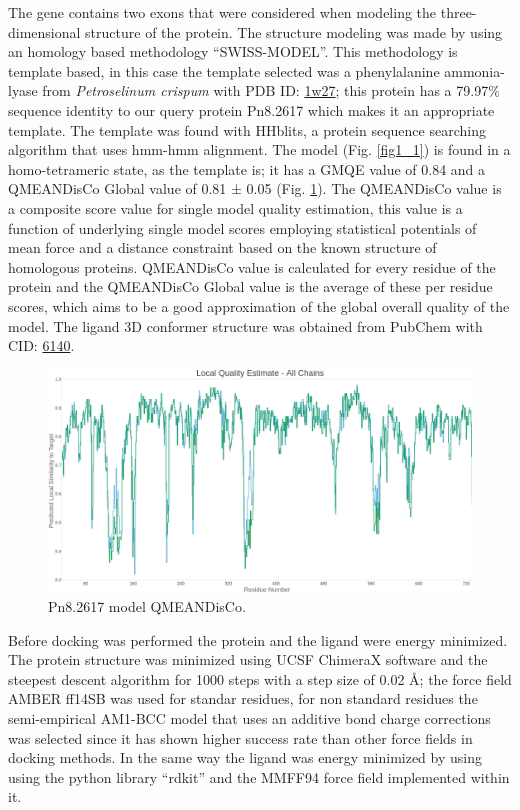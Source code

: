\documentclass[12pt]{article}
\begin{document}
	The gene contains two exons that were considered when modeling the three-dimensional structure of the protein. The structure modeling was made by using an homology based methodology ``SWISS-MODEL''. \cite{swiss,quaternary_swiss} This methodology is template based, in this case the template selected was a phenylalanine ammonia-lyase from \textit{Petroselinum crispum} with PDB ID: \href{https://www.rcsb.org/structure/1w27}{1w27}; this protein has a 79.97\% sequence identity to our query protein Pn8.2617 which makes it an appropriate template. The template was found with HHblits, a protein sequence searching algorithm that uses hmm-hmm alignment. \cite{hhblits} The model (Fig. \ref{fig1_1}) is found in a homo-tetrameric state, as the template is; it has a GMQE value of 0.84 and a QMEANDisCo Global value of 0.81 ± 0.05 (Fig. \ref{fig1_2}). The QMEANDisCo value is a composite score value for single model quality estimation, this value is a function of underlying single model scores employing statistical potentials of mean force and a distance constraint based on the known structure of homologous proteins. QMEANDisCo value is calculated for every residue of the protein and the QMEANDisCo Global value is the average of these per residue scores, which aims to be a good approximation of the global overall quality of the model. \cite{qmeandisco_swiss} The ligand 3D conformer structure was obtained from PubChem with CID: \href{https://pubchem.ncbi.nlm.nih.gov/compound/6140}{6140}.

	
	\FloatBarrier
	\begin{figure}[h!]
		\centering
		\includegraphics[width=\textwidth-50pt]{../1/Swiss/Local_quality_estimate.png}
		\caption{Pn8.2617 model QMEANDisCo.}
		\label{fig1_2}
	\end{figure}
	\FloatBarrier
	
	Before docking was performed the protein and the ligand were energy minimized. The protein structure was minimized using UCSF ChimeraX software \cite{chimera,chimera_2} and the steepest descent algorithm for 1000 steps with a step size of 0.02 \r{A}; the force field AMBER ff14SB was used for standar residues, for non standard residues the semi-empirical AM1-BCC model that uses an additive bond charge corrections was selected since it has shown higher success rate than other force fields in docking methods. \cite{am1_bcc,am1_bcc_2,am1_bcc_3} In the same way the ligand was energy minimized by using using the python library ``rdkit'' and the MMFF94 force field implemented within it. \cite{rdkit,rdkit_mmff}
	
\end{document}
